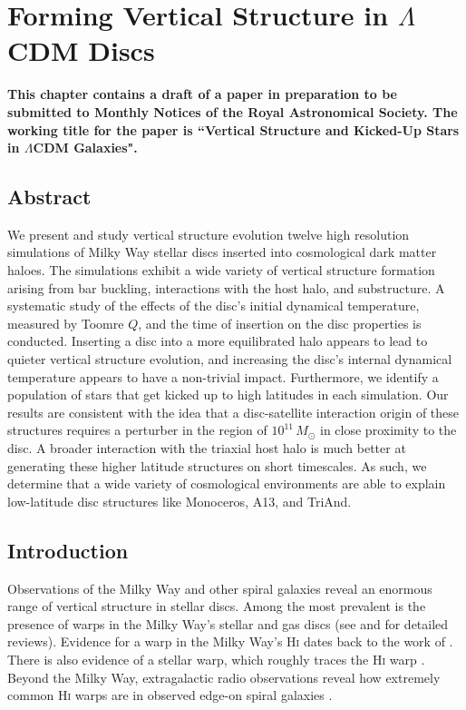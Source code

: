 
\newcommand{\kpch}{\ensuremath{h^{-1} \, \text{kpc}}}
\newcommand{\kpc}{\ensuremath{\text{kpc}}}
\newcommand{\solarmh}{\ensuremath{h^{-1} \, M_\odot}}
\newcommand{\solarm}{M_\odot}
\chapter{Forming Vertical Structure in $\Lambda$CDM Discs}\label{ch:paper_iii}
\textbf{This chapter contains a draft of a paper in preparation to be submitted to Monthly Notices of the Royal Astronomical Society. The working title for the paper is ``Vertical Structure and Kicked-Up Stars in $\Lambda$CDM Galaxies". }

\newpage
\section{Abstract}
We present and study vertical structure evolution twelve high resolution simulations of Milky Way stellar discs inserted into cosmological dark matter haloes. The simulations exhibit a wide variety of vertical structure formation arising from bar buckling, interactions with the host halo, and substructure. A systematic study of the effects of the disc's initial dynamical temperature, measured by Toomre $Q$, and the time of insertion on the disc properties is conducted. Inserting a disc into a more equilibrated halo appears to lead to quieter vertical structure evolution, and increasing the disc's internal dynamical temperature appears to have a non-trivial impact. Furthermore, we identify a population of stars that get kicked up to high latitudes in each simulation. Our results are consistent with the idea that a disc-satellite interaction origin of these structures requires a perturber in the region of $10^{11} \, \solarm$ in close proximity to the disc. A broader interaction with the triaxial host halo is much better at generating these higher latitude structures on short timescales.  As such, we determine that a wide variety of cosmological environments are able to explain low-latitude disc structures like Monoceros, A13, and TriAnd. 
\section{Introduction} \label{sec:introduction}



Observations of the Milky Way and other spiral galaxies reveal an enormous range of vertical structure in stellar discs. Among the most prevalent is the presence of warps in the Milky Way's stellar and gas discs (see \citet{binney_1992} and \citet{Sellwood2013} for detailed reviews). Evidence for a warp in the Milky Way's \textsc{Hi} dates  back to the work of \citet{oort_1958}.  There is also evidence of a stellar warp, which roughly traces the \textsc{Hi} warp \citep{cox_1996, reyle_2009}. Beyond the Milky Way, extragalactic radio observations reveal how extremely common \textsc{Hi} warps are in observed edge-on spiral galaxies \citep[see][for example]{sancisi_1976,bosma_1991, garcia-ruiz_2002}. 

